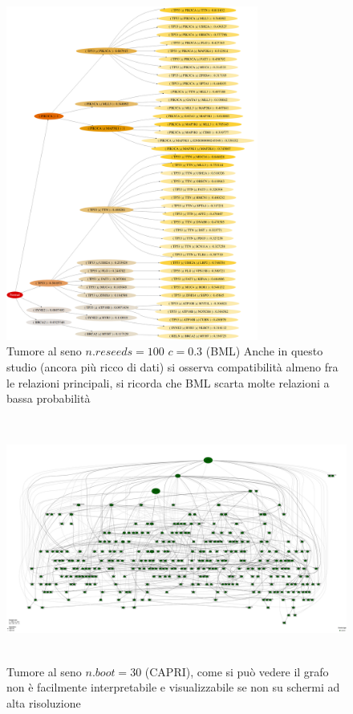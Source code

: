 \documentclass[a4paper]{article}
\begin{document}
	\begin{figure}[H]
	  \centering
	  \includegraphics[height=11cm, keepaspectratio]{BRCA_SM7.png}%
	  \captionsetup{justification=centering,margin=0.5cm}
	  \caption{Tumore al seno $n.reseeds=100$ $c=0.3$ (BML) Anche in questo studio (ancora più ricco di dati) si osserva compatibilità almeno fra le relazioni principali, si ricorda che BML scarta molte relazioni a bassa probabilità} 
	\end{figure}

	\begin{figure}[H]
	  \centering
	  \includegraphics[height=8cm, keepaspectratio]{BRCA_SM7_capri.png}%
	  \captionsetup{justification=centering,margin=0.5cm}
	  \caption{Tumore al seno $n.boot=30$ (CAPRI), come si può vedere il grafo non è facilmente interpretabile e visualizzabile se non su schermi ad alta risoluzione} 
	\end{figure}
\end{document}
